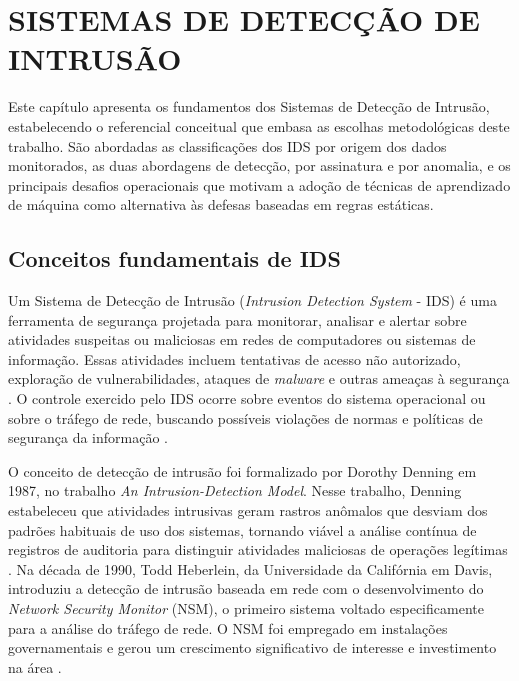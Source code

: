 \chapter{SISTEMAS DE DETECÇÃO DE INTRUSÃO}

Este capítulo apresenta os fundamentos dos Sistemas de Detecção de Intrusão, estabelecendo o referencial conceitual que embasa as escolhas metodológicas deste trabalho. São abordadas as classificações dos IDS por origem dos dados monitorados, as duas abordagens de detecção, por assinatura e por anomalia, e os principais desafios operacionais que motivam a adoção de técnicas de aprendizado de máquina como alternativa às defesas baseadas em regras estáticas.

\section{Conceitos fundamentais de IDS}

Um Sistema de Detecção de Intrusão (\textit{Intrusion Detection System} - IDS) é uma ferramenta de segurança projetada para monitorar, analisar e alertar sobre atividades suspeitas ou maliciosas em redes de computadores ou sistemas de informação. Essas atividades incluem tentativas de acesso não autorizado, exploração de vulnerabilidades, ataques de \textit{malware} e outras ameaças à segurança \cite{santos2023ercemapi}. O controle exercido pelo IDS ocorre sobre eventos do sistema operacional ou sobre o tráfego de rede, buscando possíveis violações de normas e políticas de segurança da informação \cite{liborio2015}.

O conceito de detecção de intrusão foi formalizado por Dorothy Denning em 1987, no trabalho \textit{An Intrusion-Detection Model}. Nesse trabalho, Denning estabeleceu que atividades intrusivas geram rastros anômalos que desviam dos padrões habituais de uso dos sistemas, tornando viável a análise contínua de registros de auditoria para distinguir atividades maliciosas de operações legítimas \cite{ids_introducao}. Na década de 1990, Todd Heberlein, da Universidade da Califórnia em Davis, introduziu a detecção de intrusão baseada em rede com o desenvolvimento do \textit{Network Security Monitor} (NSM), o primeiro sistema voltado especificamente para a análise do tráfego de rede. O NSM foi empregado em instalações governamentais e gerou um crescimento significativo de interesse e investimento na área \cite{ids_introducao}.

